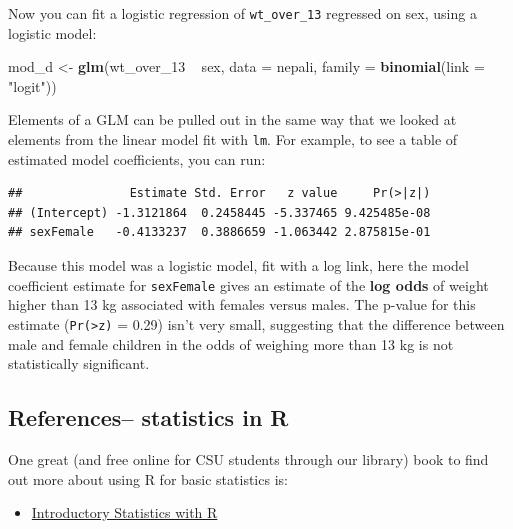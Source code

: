 \documentclass[]{book}
\makeatletter
\newenvironment{Shaded}{\begin{snugshade}}{\end{snugshade}}
\newcommand{\KeywordTok}[1]{\textcolor[rgb]{0.13,0.29,0.53}{\textbf{{#1}}}}
\newcommand{\DataTypeTok}[1]{\textcolor[rgb]{0.13,0.29,0.53}{{#1}}}
\newcommand{\StringTok}[1]{\textcolor[rgb]{0.31,0.60,0.02}{{#1}}}
\newcommand{\NormalTok}[1]{{#1}}
\providecommand{\tightlist}{%
  \setlength{\itemsep}{0pt}\setlength{\parskip}{0pt}}
\newenvironment{kframe}{%
\medskip{}
\setlength{\fboxsep}{.8em}
 \def\at@end@of@kframe{}%
 \ifinner\ifhmode%
  \def\at@end@of@kframe{\end{minipage}}%
  \begin{minipage}{\columnwidth}%
 \fi\fi%
 \def\FrameCommand##1{\hskip\@totalleftmargin \hskip-\fboxsep
 \colorbox{shadecolor}{##1}\hskip-\fboxsep
     \hskip-\linewidth \hskip-\@totalleftmargin \hskip\columnwidth}%
 \MakeFramed {\advance\hsize-\width
   \@totalleftmargin\z@ \linewidth\hsize
   \@setminipage}}%
 {\par\unskip\endMakeFramed%
 \at@end@of@kframe}
\renewenvironment{Shaded}{\begin{kframe}}{\end{kframe}}
\makeatother
\begin{document}
Now you can fit a logistic regression of \texttt{wt\_over\_13} regressed
on sex, using a logistic model:

\begin{Shaded}
\begin{Highlighting}[]
\NormalTok{mod_d <-}\StringTok{ }\KeywordTok{glm}\NormalTok{(wt_over_13 ~}\StringTok{ }\NormalTok{sex, }\DataTypeTok{data =} \NormalTok{nepali,}
             \DataTypeTok{family =} \KeywordTok{binomial}\NormalTok{(}\DataTypeTok{link =} \StringTok{"logit"}\NormalTok{))}
\end{Highlighting}
\end{Shaded}

Elements of a GLM can be pulled out in the same way that we looked at
elements from the linear model fit with \texttt{lm}. For example, to see
a table of estimated model coefficients, you can run:

\begin{Shaded}
\end{Shaded}

\begin{verbatim}
##               Estimate Std. Error   z value     Pr(>|z|)
## (Intercept) -1.3121864  0.2458445 -5.337465 9.425485e-08
## sexFemale   -0.4133237  0.3886659 -1.063442 2.875815e-01
\end{verbatim}

Because this model was a logistic model, fit with a log link, here the
model coefficient estimate for \texttt{sexFemale} gives an estimate of
the \textbf{log odds} of weight higher than 13 kg associated with
females versus males. The p-value for this estimate
(\texttt{Pr(\textgreater{}\textbar{}z\textbar{})} = 0.29) isn't very
small, suggesting that the difference between male and female children
in the odds of weighing more than 13 kg is not statistically
significant.

\subsection{References-- statistics in
R}\label{references-statistics-in-r}

One great (and free online for CSU students through our library) book to
find out more about using R for basic statistics is:

\begin{itemize}
\tightlist
\item
  \href{http://discovery.library.colostate.edu/Record/.b44705323}{Introductory
  Statistics with R}
\end{itemize}
\end{document}
